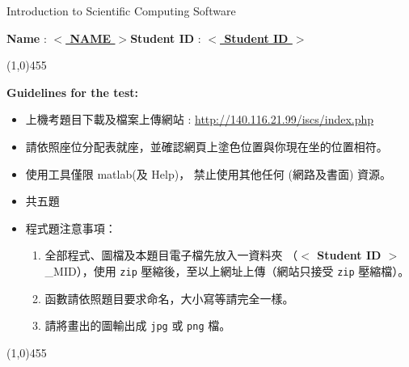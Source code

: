 \documentclass[12pt,a4paper]{article}
\newcommand{\placeholder}[1]{\textbf{$<$ #1 $>$}}
\newcommand{\idnumber}{\placeholder{Student ID}}
\newcommand{\name}{\placeholder{NAME}}
\begin{document}
\begin{center}{\large Introduction to Scientific Computing Software}\end{center}

\begin{center}\textbf{Name} : \underline{ \name{}}\qquad\qquad\qquad\textbf{Student ID} : \underline{ \idnumber{}}\end{center}

\begin{center}
\line(1,0){455}
\end{center}
\textbf{Guidelines for the test:}
\begin{itemize}
\item 上機考題目下載及檔案上傳網站 : \url{http://140.116.21.99/iscs/index.php}
\item 請依照座位分配表就座，並確認網頁上塗色位置與你現在坐的位置相符。
\item 使用工具僅限 matlab(及 Help)， 禁止使用其他任何 (網路及書面) 資源。
\item 共五題
\item 程式題注意事項：
\begin{enumerate}
\item 全部程式、圖檔及本題目電子檔先放入一資料夾 （\idnumber{}\_MID），使用 \texttt{zip} 壓縮後，至以上網址上傳（網站只接受 \texttt{zip} 壓縮檔）。
\item 函數請依照題目要求命名，大小寫等請完全一樣。
\item 請將畫出的圖輸出成 \texttt{jpg} 或 \texttt{png} 檔。
\end{enumerate}
\end{itemize}
\begin{center}
\line(1,0){455}
\end{center}

\end{document}
